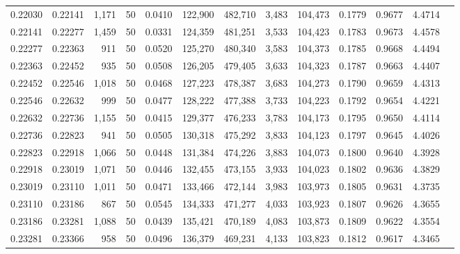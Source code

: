 \begin{tabular}{rrrrrrrrrrrrr}
0.22030 & 0.22141 & 1,171 &  50 &                                     0.0410 & 122,900 & 482,710 &   3,483 & 104,473 & 0.1779 & 0.9677 & 4.4714 \\
0.22141 & 0.22277 & 1,459 &  50 &                                     0.0331 & 124,359 & 481,251 &   3,533 & 104,423 & 0.1783 & 0.9673 & 4.4578 \\
0.22277 & 0.22363 &   911 &  50 &                                     0.0520 & 125,270 & 480,340 &   3,583 & 104,373 & 0.1785 & 0.9668 & 4.4494 \\
0.22363 & 0.22452 &   935 &  50 &                                     0.0508 & 126,205 & 479,405 &   3,633 & 104,323 & 0.1787 & 0.9663 & 4.4407 \\
0.22452 & 0.22546 & 1,018 &  50 &                                     0.0468 & 127,223 & 478,387 &   3,683 & 104,273 & 0.1790 & 0.9659 & 4.4313 \\
0.22546 & 0.22632 &   999 &  50 &                                     0.0477 & 128,222 & 477,388 &   3,733 & 104,223 & 0.1792 & 0.9654 & 4.4221 \\
0.22632 & 0.22736 & 1,155 &  50 &                                     0.0415 & 129,377 & 476,233 &   3,783 & 104,173 & 0.1795 & 0.9650 & 4.4114 \\
0.22736 & 0.22823 &   941 &  50 &                                     0.0505 & 130,318 & 475,292 &   3,833 & 104,123 & 0.1797 & 0.9645 & 4.4026 \\
0.22823 & 0.22918 & 1,066 &  50 &                                     0.0448 & 131,384 & 474,226 &   3,883 & 104,073 & 0.1800 & 0.9640 & 4.3928 \\
0.22918 & 0.23019 & 1,071 &  50 &                                     0.0446 & 132,455 & 473,155 &   3,933 & 104,023 & 0.1802 & 0.9636 & 4.3829 \\
0.23019 & 0.23110 & 1,011 &  50 &                                     0.0471 & 133,466 & 472,144 &   3,983 & 103,973 & 0.1805 & 0.9631 & 4.3735 \\
0.23110 & 0.23186 &   867 &  50 &                                     0.0545 & 134,333 & 471,277 &   4,033 & 103,923 & 0.1807 & 0.9626 & 4.3655 \\
0.23186 & 0.23281 & 1,088 &  50 &                                     0.0439 & 135,421 & 470,189 &   4,083 & 103,873 & 0.1809 & 0.9622 & 4.3554 \\
0.23281 & 0.23366 &   958 &  50 &                                     0.0496 & 136,379 & 469,231 &   4,133 & 103,823 & 0.1812 & 0.9617 & 4.3465 \\

\end{tabular}
